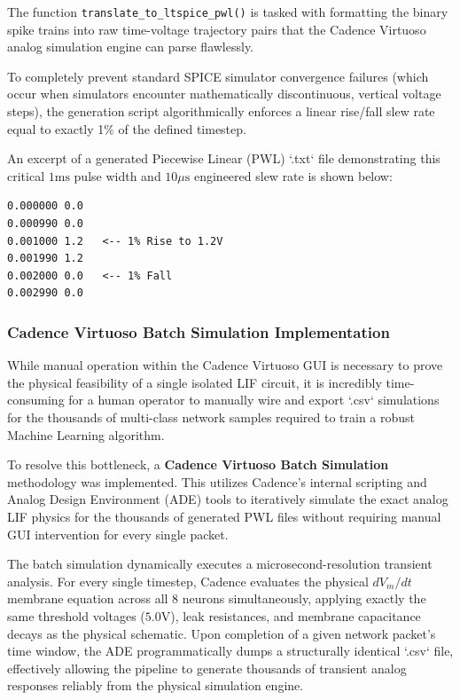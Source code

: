 \documentclass{ieeeaccess}
\begin{document}
The function \texttt{translate\_to\_ltspice\_pwl()} is tasked with formatting the binary spike trains into raw time-voltage trajectory pairs that the Cadence Virtuoso analog simulation engine can parse flawlessly. 

To completely prevent standard SPICE simulator convergence failures (which occur when simulators encounter mathematically discontinuous, vertical voltage steps), the generation script algorithmically enforces a linear rise/fall slew rate equal to exactly 1\% of the defined timestep.

An excerpt of a generated Piecewise Linear (PWL) `.txt` file demonstrating this critical $1\text{ms}$ pulse width and $10\mu\text{s}$ engineered slew rate is shown below:
{\footnotesize
\begin{verbatim}
0.000000 0.0
0.000990 0.0
0.001000 1.2   <-- 1% Rise to 1.2V
0.001990 1.2
0.002000 0.0   <-- 1% Fall
0.002990 0.0
\end{verbatim}
}

\subsubsection{Cadence Virtuoso Batch Simulation Implementation}

While manual operation within the Cadence Virtuoso GUI is necessary to prove the physical feasibility of a single isolated LIF circuit, it is incredibly time-consuming for a human operator to manually wire and export `.csv` simulations for the thousands of multi-class network samples required to train a robust Machine Learning algorithm.

To resolve this bottleneck, a \textbf{Cadence Virtuoso Batch Simulation} methodology was implemented. This utilizes Cadence's internal scripting and Analog Design Environment (ADE) tools to iteratively simulate the exact analog LIF physics for the thousands of generated PWL files without requiring manual GUI intervention for every single packet. 

The batch simulation dynamically executes a microsecond-resolution transient analysis. For every single timestep, Cadence evaluates the physical $dV_m/dt$ membrane equation across all 8 neurons simultaneously, applying exactly the same threshold voltages ($5.0\text{V}$), leak resistances, and membrane capacitance decays as the physical schematic. Upon completion of a given network packet's time window, the ADE programmatically dumps a structurally identical `.csv` file, effectively allowing the pipeline to generate thousands of transient analog responses reliably from the physical simulation engine.
\end{document}
